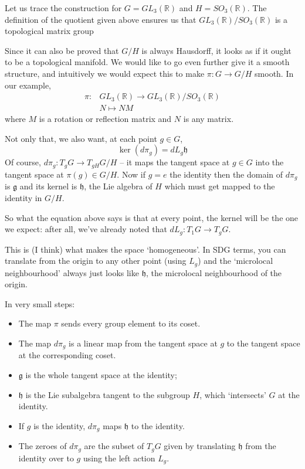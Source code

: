 \documentclass[oneside,english]{amsbook}
\numberwithin{section}{chapter}
\theoremstyle{plain}
\theoremstyle{definition}
\begin{document}
Let us trace the construction for  $G = GL_3(\mathbb{R})$ and $H = SO_3(\mathbb{R})$. The definition of the quotient given above ensures us that $GL_3(\mathbb{R})/SO_3(\mathbb{R})$ is a topological matrix group

Since it can also be proved that $G/H$ is always Hausdorff, it looks as if it ought to be a topological manifold. We would like to go even further give it a smooth structure, and intuitively we would expect this to make $\pi:G\to G/H$ smooth. In our example,
\begin{align}
	\pi: & GL_3(\mathbb{R}) \to GL_3(\mathbb{R})/SO_3(\mathbb{R}) \\
	& N \mapsto NM
\end{align}
where $M$ is a rotation or reflection matrix and $N$ is any matrix.

Not only that, we also want, at each point $g\in G$,
\[
	\ker(d\pi_g) = dL_g\mathfrak{h}
\] 
Of course, $d\pi_g: T_gG\to T_{gH}G/H$ -- it maps the tangent space at $g\in G$ into the tangent space at $\pi(g)\in G/H$. Now if $g = e$ the identity then the domain of $d\pi_g$ is $\mathfrak{g}$ and its kernel is $\mathfrak{h}$, the Lie algebra of $H$ which must get mapped to the identity in $G/H$. 

So what the equation above says is that at every point, the kernel will be the one we expect: after all, we've already noted that $dL_g:T_1G\to T_gG$.

This is (I think) what makes the space `homogeneous'. In SDG terms, you can translate from the origin to any other point (using $L_g$) and the `microlocal neighbourhood' always just looks like $\mathfrak{h}$, the microlocal neighbourhood of the origin.

In very small steps:
\begin{itemize}
	\item The map $\pi$ sends every group element to its coset.
	\item The map $d\pi_g$ is a linear map from the tangent space at $g$ to the tangent space at the corresponding coset.
	\item $\mathfrak{g}$ is the whole tangent space at the identity; 
	\item $\mathfrak{h}$ is the Lie subalgebra tangent to the subgroup $H$, which `intersects' $G$ at the identity.
	\item If $g$ is the identity, $d\pi_g$ maps $\mathfrak{h}$ to the identity.
	\item The zeroes of $d\pi_g$ are the subset of $T_gG$ given by translating $\mathfrak{h}$ from the identity over to $g$ using the left action $L_g$.
\end{itemize} 
\end{document}
